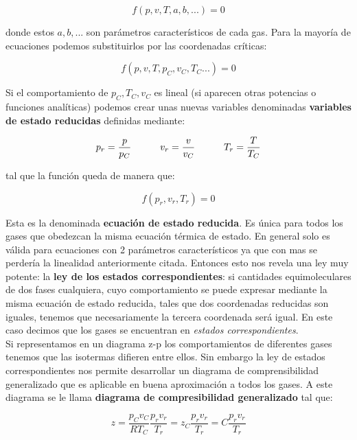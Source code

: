 \documentclass[12pt]{book}
\begin{document}
\begin{equation}
f(p,v,T,a,b,...) = 0
\end{equation}

donde estos $a,b,...$ son parámetros característicos de cada gas. Para la mayoría de ecuaciones podemos substituirlos por las coordenadas críticas:

\begin{equation}
f(p,v,T,p_C,v_C,T_C...) = 0
\end{equation}

Si el comportamiento de $p_C,T_C,v_C$ es lineal (si aparecen otras potencias o funciones analíticas) podemos crear unas nuevas variables denominadas \textbf{variables de estado reducidas} definidas mediante:

\begin{equation}
p_r = \dfrac{p}{p_C} \quad \quad \quad v_r = \dfrac{v}{v_C} \quad \quad \quad T_r = \dfrac{T}{T_C}
\end{equation}

tal que la función queda de manera que:

\begin{equation}
f(p_r,v_r,T_r) = 0
\end{equation}

Esta es la denominada \textbf{ecuación de estado reducida}. Es única para todos los gases que obedezcan la misma ecuación térmica de estado. En general solo es válida para ecuaciones con 2 parámetros característicos ya que con mas se perdería la linealidad anteriormente citada. Entonces esto nos revela una ley muy potente: la \textbf{ley de los estados correspondientes}: si cantidades equimoleculares de dos fases cualquiera, cuyo comportamiento se puede expresar mediante la misma ecuación de estado reducida, tales que dos coordenadas reducidas son iguales, tenemos que necesariamente la tercera coordenada será igual. En este caso decimos que los gases se encuentran en \textit{estados correspondientes}. \\

Si representamos en un diagrama z-p los comportamientos de diferentes gases tenemos que las isotermas difieren entre ellos. Sin embargo la ley de estados correspondientes nos permite desarrollar un diagrama de comprensibilidad generalizado que es aplicable en buena aproximación a todos los gases. A este diagrama se le llama \textbf{diagrama de compresibilidad generalizado} tal que:

\begin{equation}
z = \dfrac{p_C v_C}{R T_C} \dfrac{p_r v_r}{T_r} = z_C \dfrac{p_r v_r}{T_r} = C \dfrac{p_r v_r}{T_r}
\end{equation}
\end{document}
